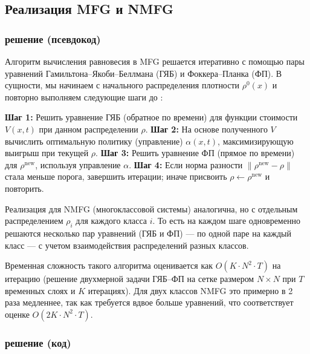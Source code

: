 \subsection{Реализация MFG и NMFG}
\subsubsection{решение (псевдокод)}

Алгоритм вычисления равновесия в MFG решается итеративно с помощью пары уравнений Гамильтона–Якоби–Беллмана (ГЯБ) и Фоккера–Планка (ФП). В сущности, мы начинаем с начального распределения плотности $\rho^0(x)$ и повторно выполняем следующие шаги до \cite{cardaliaguet2013notes}:

\begin{algorithm}[H]
\caption{Итеративное вычисление равновесия для MFG/NMFG}
\begin{algorithmic}[1]
    \State \textbf{Шаг 1:} Решить уравнение ГЯБ (обратное по времени) для функции стоимости $V(x,t)$ при данном распределении $\rho$.
    \State \textbf{Шаг 2:} На основе полученного $V$ вычислить оптимальную политику (управление) $\alpha(x,t)$, максимизирующую выигрыш при текущей $\rho$.
    \State \textbf{Шаг 3:} Решить уравнение ФП (прямое по времени) для $\rho^{\text{new}}$, используя управление $\alpha$.
    \State \textbf{Шаг 4:} Если норма разности $\|\rho^{\text{new}} - \rho\|$ стала меньше порога, завершить итерации; иначе присвоить $\rho \gets \rho^{\text{new}}$ и повторить.
\end{algorithmic}
\end{algorithm}

Реализация для NMFG (многоклассовой системы) аналогична, но с отдельным распределением $\rho_i$ для каждого класса $i$. То есть на каждом шаге одновременно решаются несколько пар уравнений (ГЯБ и ФП) — по одной паре на каждый класс — с учетом взаимодействия распределений разных классов. 

Временная сложность такого алгоритма оценивается как $O(K \cdot N^2 \cdot T)$ на итерацию (решение двухмерной задачи ГЯБ–ФП на сетке размером $N \times N$ при $T$ временных слоях и $K$ итерациях). Для двух классов NMFG это примерно в 2 раза медленнее, так как требуется вдвое больше уравнений, что соответствует оценке $O(2K \cdot N^2 \cdot T)$.

\subsubsection{решение (код)}

